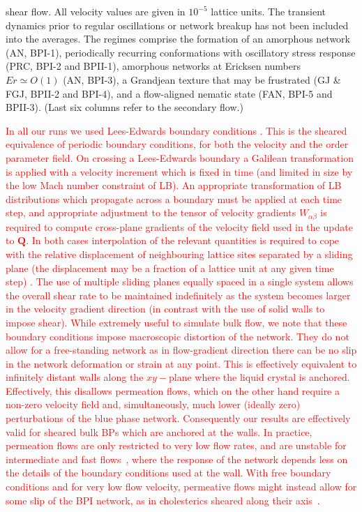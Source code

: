 \documentclass[8.5pt,twoside,twocolumn]{article}
\newcommand{\rev}[1]{{\textcolor{red}{#1}}}
\begin{document}
\begin{table}[htpb]
{{shear flow. All velocity values are given in $10^{-5}$ lattice units. The transient dynamics 
prior to regular oscillations or network breakup has not been included into the averages. 
The regimes comprise the formation of an amorphous network (AN, BPI-1), 
periodically recurring conformations with oscillatory stress response (PRC, BPI-2 and BPII-1), 
amorphous networks at Ericksen numbers ${Er\simeq O(1)}$ (AN, BPI-3), 
a Grandjean texture that may be frustrated (GJ \& FGJ, BPII-2 and BPI-4),
and a flow-aligned nematic state (FAN, BPI-5 and BPII-3).
(Last six columns refer to the secondary flow.)}
}
\label{tab1}
\end{table}

\rev{
In all our runs we used Lees-Edwards boundary conditions \cite{Wagner:2002}.
This is the sheared equivalence of periodic boundary conditions, for both the 
velocity and the order parameter field. 
On crossing a Lees-Edwards boundary a Galilean transformation is applied
with a velocity increment which is fixed in time (and limited in size by the
low Mach number constraint of LB). An appropriate transformation
of LB distributions which propagate across a boundary
must be applied at each time step, and appropriate
adjustment to the tensor of velocity gradients $W_{\alpha\beta}$ 
is required to compute cross-plane gradients of the velocity field 
used in the update to ${\mathbf Q}$. In both cases interpolation of the
relevant quantities is required to cope with the relative displacement
of neighbouring lattice sites separated by a sliding plane (the
displacement may be a fraction of a lattice unit at any given time
step) \cite{Henrich:2012a}. The use of multiple sliding planes equally spaced in a single
system allows the overall shear rate to be maintained indefinitely as the system
becomes larger in the velocity gradient direction (in contrast with the use of solid
walls to impose shear).
While extremely useful to simulate bulk flow, we
note that these boundary conditions impose macroscopic distortion
of the network. They do not allow for a free-standing network as
in flow-gradient direction there can be no slip in the network deformation 
or strain at any point.
This is effectively equivalent to infinitely distant
walls along the $xy-$plane where the liquid crystal is anchored. 
Effectively, this disallows permeation flows, which on the other
hand require a non-zero velocity field and, simultaneously,
much lower (ideally zero) perturbations of the blue phase network.
Consequently our results are effectively valid for sheared bulk 
BPs which are anchored at the walls. In practice, permeation flows are 
only restricted to very low flow rates, and are unstable for intermediate 
and fast flows~\cite{Dupuis:2005}, 
where the response of the network depends less on
the details of the boundary conditions used at the wall.
With free boundary conditions and for very low flow velocity, 
permeative flows might instead allow for
some slip of the BPI network, as in cholesterics sheared
along their axis~\cite{Marenduzzo:2006a, Marenduzzo:2006b}.
}


\footnotesize{
}
\end{document}
